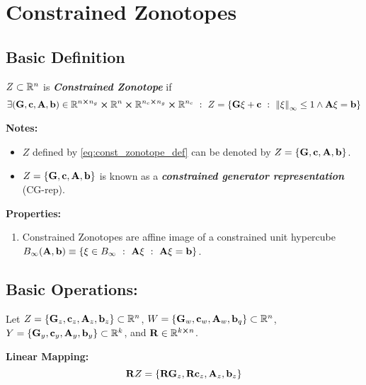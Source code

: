 \section{Constrained Zonotopes}
\subsection{Basic Definition}
\begin{definition}
    $Z \subset \mathbb{R}^n$ is \emph{\textbf{Constrained Zonotope}} if \begin{equation}\label{eq:const_zonotope_def}
        \exists (\vb{G}, \vb{c}, \vb{A}, \vb{b}) 
            \in \mathbb{R}^{n \cross n_g} \cross \mathbb{R}^{n} \cross \mathbb{R}^{n_c \cross n_g} \cross \mathbb{R}^{n_c} 
        \ : \  Z = \qty{
            \vb{G} \vb{\xi} + \vb{c} 
            \ : \ \norm{\vb{\xi}}_\infty \leq 1 
                \land \vb{A} \vb{\xi} = \vb{b}
        }
    \end{equation}
\end{definition}

\textbf{Notes:}
\begin{itemize}
    \item $Z$ defined by \eqref{eq:const_zonotope_def} can be denoted by $Z = \{\vb{G}, \vb{c}, \vb{A}, \vb{b}\}$.
    \item $Z = \{\vb{G}, \vb{c}, \vb{A}, \vb{b}\}$ is known as a \emph{\textbf{constrained generator representation}} (CG-rep).
\end{itemize}

\textbf{Properties:}
\begin{enumerate}
    \item Constrained Zonotopes are affine image of a constrained unit hypercube $B_{\infty}(\vb{A},\vb{b}) \equiv \{\xi \in B_\infty \ : \  \vb{A} \vb{\xi} \ : \  \vb{A} \vb{\xi} = \vb{b}\}$.
\end{enumerate}

\subsection{Basic Operations:}
Let $Z = \{\vb{G}_z, \vb{c}_z, \vb{A}_z, \vb{b}_z\} \subset \mathbb{R}^n$, 
$W = \{\vb{G}_w, \vb{c}_w, \vb{A}_w, \vb{b}_q\} \subset \mathbb{R}^n$, 
$Y = \{\vb{G}_y, \vb{c}_y, \vb{A}_y, \vb{b}_y\} \subset \mathbb{R}^k$, 
and $\vb{R} \in \mathbb{R}^{k \cross n}$.

\textbf{Linear Mapping:}
\begin{equation}
    \vb{R} Z = \qty{
        \vb{R} \vb{G}_z, 
        \vb{R} \vb{c}_z, 
        \vb{A}_{z}, 
        \vb{b}_z
    }
\end{equation}

